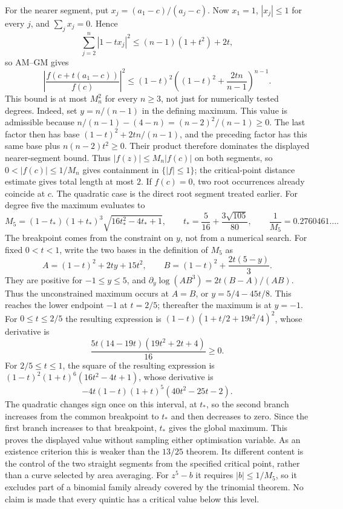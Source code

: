 \documentclass[11pt]{article}
\begin{document}
For the nearer segment, put $x_j=(a_1-c)/(a_j-c)$. Now $x_1=1$,
$|x_j|\le1$ for every $j$, and $\sum_jx_j=0$. Hence
\[
 \sum_{j=2}^n|1-tx_j|^2
 \le (n-1)(1+t^2)+2t,
\]
so AM--GM gives
\[
 \left|\frac{f(c+t(a_1-c))}{f(c)}\right|^2
 \le(1-t)^2\left((1-t)^2+\frac{2tn}{n-1}\right)^{n-1}.
\]
This bound is at most $M_n^2$ for every $n\ge3$, not just for
numerically tested degrees. Indeed, set $y=n/(n-1)$ in the defining
maximum. This value is admissible because
$n/(n-1)-(4-n)=(n-2)^2/(n-1)\ge0$. The last factor then has base
$(1-t)^2+2tn/(n-1)$, and the preceding factor has this same base plus
$n(n-2)t^2\ge0$. Their product therefore dominates the displayed
nearer-segment bound. Thus $|f(z)|\le M_n|f(c)|$ on both segments, so
$0<|f(c)|\le1/M_n$ gives containment in $\{|f|\le1\}$; the
critical-point distance estimate gives total length at most $2$.
If $f(c)=0$, two root occurrences already coincide at $c$.
The quadratic case is the direct root segment treated earlier.
For degree five the maximum evaluates to
\[
 M_5=(1-t_*)(1+t_*)^3\sqrt{16t_*^2-4t_*+1},
 \qquad
 t_*=\frac{5}{16}+\frac{3\sqrt{105}}{80},
 \qquad
 \frac{1}{M_5}=0.2760461\ldots.
\]
The breakpoint comes from the constraint on $y$, not from a numerical
search. For fixed $0<t<1$, write the two bases in the definition of
$M_5$ as
\[
 A=(1-t)^2+2ty+15t^2,\qquad
 B=(1-t)^2+\frac{2t(5-y)}3.
\]
They are positive for $-1\le y\le5$, and
$\partial_y\log(AB^3)=2t(B-A)/(AB)$. Thus the unconstrained maximum
occurs at $A=B$, or $y=5/4-45t/8$. This reaches the lower endpoint
$-1$ at $t=2/5$; thereafter the maximum is at $y=-1$.
For $0\le t\le2/5$ the resulting expression is
$(1-t)(1+t/2+19t^2/4)^2$, whose derivative is
\[
 \frac{5t(14-19t)(19t^2+2t+4)}{16}\ge0.
\]
For $2/5\le t\le1$, the square of the resulting expression is
$(1-t)^2(1+t)^6(16t^2-4t+1)$, whose derivative is
\[
 -4t(1-t)(1+t)^5(40t^2-25t-2).
\]
The quadratic changes sign once on this interval, at $t_*$, so the
second branch increases from the common breakpoint to $t_*$ and then
decreases to zero. Since the first branch increases to that breakpoint,
$t_*$ gives the global maximum. This proves the displayed value without
sampling either optimisation variable.
As an existence criterion this is weaker than the $13/25$ theorem.
Its different content is the control of the two straight segments from
the specified critical point, rather than a curve selected by area
averaging. For $z^5-b$ it requires $|b|\le1/M_5$, so it excludes part
of a binomial family already covered by the trinomial theorem. No claim
is made that every quintic has a critical value below this level.
\end{document}
